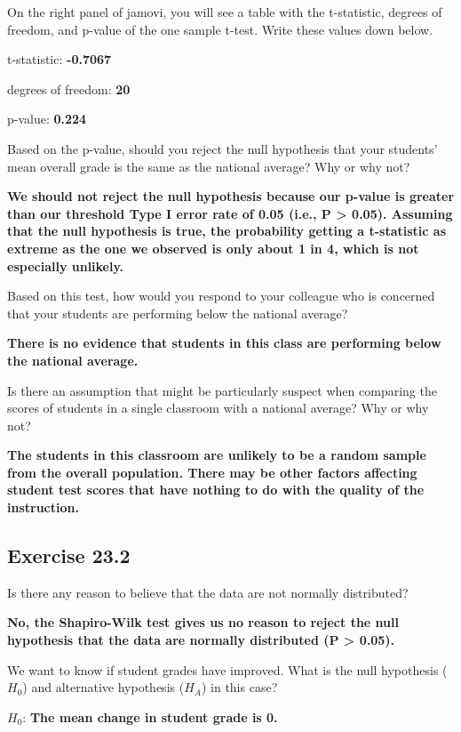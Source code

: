 \documentclass[
]{scrbook}
\begin{document}
On the right panel of jamovi, you will see a table with the t-statistic, degrees of freedom, and p-value of the one sample t-test. Write these values down below.

t-statistic: \textbf{-0.7067}

degrees of freedom: \textbf{20}

p-value: \textbf{0.224}

Based on the p-value, should you reject the null hypothesis that your students' mean overall grade is the same as the national average? Why or why not?

\textbf{We should not reject the null hypothesis because our p-value is greater than our threshold Type I error rate of 0.05 (i.e., P \textgreater{} 0.05). Assuming that the null hypothesis is true, the probability getting a t-statistic as extreme as the one we observed is only about 1 in 4, which is not especially unlikely.}

Based on this test, how would you respond to your colleague who is concerned that your students are performing below the national average?

\textbf{There is no evidence that students in this class are performing below the national average.}

Is there an assumption that might be particularly suspect when comparing the scores of students in a single classroom with a national average? Why or why not?

\textbf{The students in this classroom are unlikely to be a random sample from the overall population. There may be other factors affecting student test scores that have nothing to do with the quality of the instruction.}

\hypertarget{exercise-23.2}{%
\subsection{Exercise 23.2}\label{exercise-23.2}}

Is there any reason to believe that the data are not normally distributed?

\textbf{No, the Shapiro-Wilk test gives us no reason to reject the null hypothesis that the data are normally distributed (P \textgreater{} 0.05).}

We want to know if student grades have improved. What is the null hypothesis (\(H_{0}\)) and alternative hypothesis (\(H_{A}\)) in this case?

\(H_{0}\): \textbf{The mean change in student grade is 0.}
\end{document}
